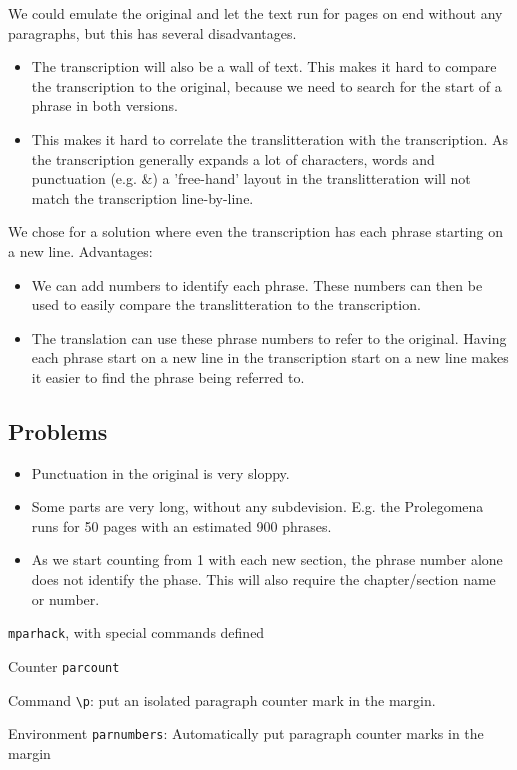 \documentclass[12pt]{report}
\begin{document}
We could emulate the original and let the text run for pages on end without any paragraphs, but this has
several disadvantages.
\begin{itemize}
\item The transcription will also be a wall of text. This makes it hard to compare the transcription to the original, because
we need to search for the start of a phrase in both versions.
\item This makes it hard to correlate the translitteration with the transcription. As the transcription generally expands
a lot of characters, words and punctuation (e.g. \&) a 'free-hand' layout in the translitteration will not match the transcription
line-by-line.
\end{itemize}
We chose for a solution where even the transcription has each phrase starting on a new line. Advantages:
\begin{itemize}
\item We can add numbers to identify each phrase. These numbers can then be used to easily compare the translitteration
to the transcription.
\item The translation can use these phrase numbers to refer to the original. Having each phrase start on a new line
in the transcription start on a new line makes it easier to find the phrase being referred to.
\end{itemize}

\subsection{Problems}
\begin{itemize}
\item Punctuation in the original is very sloppy.
\item Some parts are very long, without any subdevision. E.g. the Prolegomena runs for
50 pages with an estimated 900 phrases.
\item As we start counting from 1 with each new section, the phrase number alone does not identify the phase. This will
also require the chapter/section name or number.
\end{itemize}


\texttt{mparhack}, with special commands defined

Counter \texttt{parcount}

Command \verb;\p;: put an isolated paragraph counter mark in the margin.

Environment \texttt{parnumbers}: Automatically put paragraph counter marks in the margin
\end{document}
